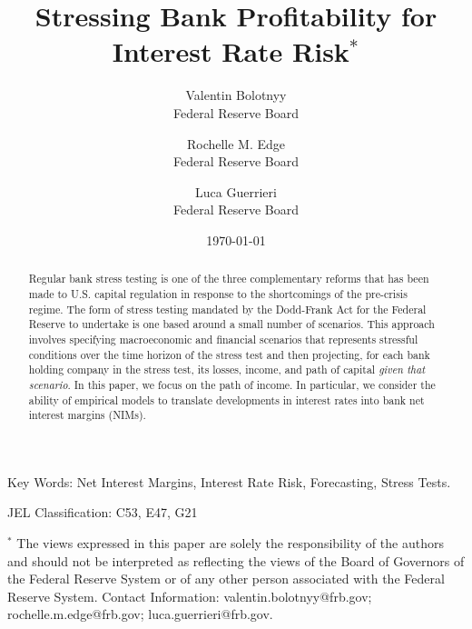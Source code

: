 \documentclass[11pt]{article}
\renewcommand{\baselinestretch}{1.5}
\begin{document}
\renewcommand{\baselinestretch}{1}
\author{{\Large Valentin Bolotnyy} \\
Federal Reserve Board \and
{\Large Rochelle M. Edge} \\
Federal Reserve Board \and
{\Large Luca Guerrieri}\\ Federal Reserve Board} 
\title{Stressing Bank Profitability for Interest Rate Risk$^*$}

 
\date{\today}
\maketitle

\begin{abstract}
Regular bank stress testing is one of the three complementary reforms that has been made to U.S. capital regulation in response to the shortcomings of the pre-crisis regime.
The form of stress testing mandated by the Dodd-Frank Act for the Federal Reserve to undertake is one based around a small number of scenarios.  This approach involves specifying macroeconomic and financial scenarios that represents stressful conditions over the time horizon of the stress test and then projecting, for each bank holding company in the stress test, its losses, income, and path of capital \textit{given that scenario}. In this paper, we focus on the path of income. In particular, we consider the ability of empirical models to translate developments in interest rates into bank net interest margins (NIMs).
\end{abstract}

\vspace{.125in}

\noindent Key Words: Net Interest Margins, Interest Rate Risk, Forecasting, Stress Tests.

\vspace{.125in}

\noindent JEL Classification: C53, E47, G21

\vspace{3cm} \renewcommand{\baselinestretch}{1} \normalsize
\noindent $^*$ The views
expressed in this paper are solely the responsibility of the
authors and should not be interpreted as reflecting the views of
the Board of Governors of the Federal Reserve System or of any
other person associated with the Federal Reserve System.
Contact Information: valentin.bolotnyy@frb.gov; rochelle.m.edge@frb.gov; luca.guerrieri@frb.gov.
\end{document}
